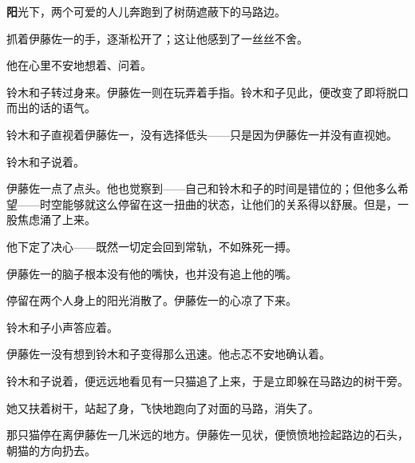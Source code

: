 
\AddSymbolsC
\pagecolor{purple!10!gray}
\color{white}
\quad\quad \lettrine[,lraise=0.2,lhang=0.5]{\textbf{阳}}{光}下，两个可爱的人儿奔跑到了树荫遮蔽下的马路边。

抓着伊藤佐一的手，逐渐松开了；这让他感到了一丝丝不舍。

他在心里不安地想着、问着。

铃木和子转过身来。伊藤佐一则在玩弄着手指。铃木和子见此，便改变了即将脱口而出的话的语气。

铃木和子直视着伊藤佐一，没有选择低头——只是因为伊藤佐一并没有直视她。

铃木和子说着。

伊藤佐一点了点头。他也觉察到——自己和铃木和子的时间是错位的；但他多么希望——时空能够就这么停留在这一扭曲的状态，让他们的关系得以舒展。但是，一股焦虑涌了上来。


他下定了决心——既然一切定会回到常轨，不如殊死一搏。


伊藤佐一的脑子根本没有他的嘴快，也并没有追上他的嘴。


停留在两个人身上的阳光消散了。伊藤佐一的心凉了下来。


铃木和子小声答应着。



伊藤佐一没有想到铃木和子变得那么迅速。他忐忑不安地确认着。



铃木和子说着，便远远地看见有一只猫追了上来，于是立即躲在马路边的树干旁。

她又扶着树干，站起了身，飞快地跑向了对面的马路，消失了。

那只猫停在离伊藤佐一几米远的地方。伊藤佐一见状，便愤愤地捡起路边的石头，朝猫的方向扔去。

